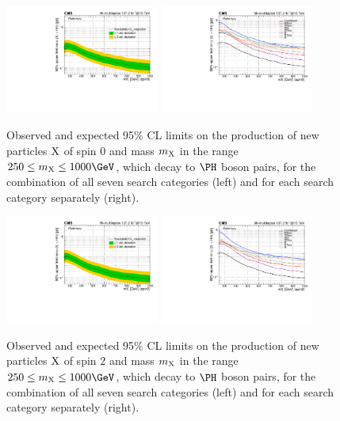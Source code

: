 \begin{figure}
  \centering
  \includegraphics[width=0.45\textwidth]{figures/massScan_spin0_multilepton_RUN2.pdf}
  \hspace{0.05\textwidth}
  \includegraphics[width=0.45\textwidth]{figures/massMultiScan_spin0_multilepton_Run2.pdf}
  \caption{
    Observed and expected 95\% CL limits on the production of new particles $\textrm{X}$ of spin $0$ 
    and mass $m_{\textrm{X}}$ in the range $250 \leq m_{\X} \leq 1000\GeV$, which decay to $\PHiggs$ boson pairs,
    for the combination of all seven search categories (left)
    and for each search category separately (right).
  }
  \label{fig:HH_limits_spin0}
\end{figure}

\begin{figure}
  \centering
  \includegraphics[width=0.45\textwidth]{figures/massScan_spin2_multilepton_RUN2.pdf}
  \hspace{0.05\textwidth}
  \includegraphics[width=0.45\textwidth]{figures/massMultiScan_spin2_multilepton_Run2.pdf}
  \caption{
    Observed and expected 95\% CL limits on the production of new particles $\textrm{X}$ of spin $2$ 
    and mass $m_{\textrm{X}}$ in the range $250 \leq m_{\X} \leq 1000\GeV$, which decay to $\PHiggs$ boson pairs,
    for the combination of all seven search categories (left)
    and for each search category separately (right).
  }
  \label{fig:HH_limits_spin2}
\end{figure}

